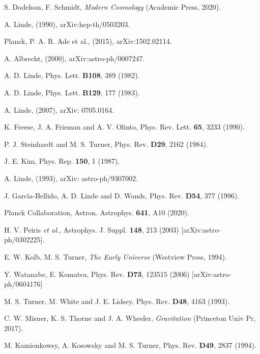 \documentclass[11pt,a4paper,twoside]{book}
\begin{document}
\begin{thebibliography}{2}
	 S. Dodelson, F. Schmidt, \emph{Modern Cosmology} (Academic Press, 2020).
	
	 A. Linde,  (1990), arXiv:hep-th/0503203.
	
	 Planck, P. A. R. Ade et al., (2015), arXiv:1502.02114.
	
	 A. Albrecht, (2000), arXiv:astro-ph/0007247.
	
	 A. D. Linde, Phys. Lett. \textbf{B108}, 389 (1982).
	
	 A. D. Linde, Phys. Lett. \textbf{B129}, 177  (1983).  
	
	 A. Linde, (2007), arXiv: 0705.0164. 
	
	 K. Freese, J. A. Frieman and A. V. Olinto, Phys. Rev. Lett. \textbf{65}, 3233 (1990).
	
	 P. J. Steinhardt and M. S. Turner, Phys. Rev. \textbf{D29}, 2162 (1984).
	
	 J. E. Kim, Phys. Rep. \textbf{150}, 1 (1987).
	
	 A. Linde, (1993), arXiv: astro-ph/9307002.
	
	 J. Garcìa-Bellido, A. D. Linde and D. Wands, Phys. Rev. \textbf{D54}, 377 (1996).
	
	 Planck Collaboration, Astron. Astrophys. \textbf{641}, A10 (2020).
	
	 H. V. Peiris \textit{et al.}, Astrophys. J. Suppl. \textbf{148}, 213 (2003) [arXiv:astro-ph/0302225].
	
	 E. W. Kolb, M. S. Turner, \textit{The Early Universe} (Westview Press, 1994).
	
	 Y. Watanabe, E. Komatsu, Phys. Rev. \textbf{D73}, 123515 (2006) [arXiv:astro-ph/0604176]
	
	 M. S. Turner, M. White and J. E. Lidsey, Phys. Rev. \textbf{D48}, 4163 (1993).
	
	 C. W. Misner, K. S. Thorne and J. A. Wheeler, \textit{Gravitation} (Princeton Univ Pr, 2017).
	
	 M. Kamionkowsy, A. Kosowsky and M. S. Turner, Phys. Rev. \textbf{D49}, 2837 (1994).
	

\end{thebibliography}
\end{document}
